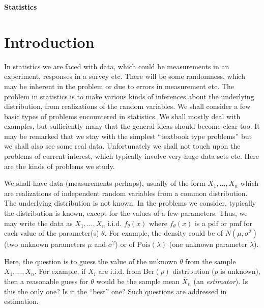 \documentclass[preprint,  11pt]{amsart}
\newcommand{\para}[1]{\vspace{4mm}\noindent{\bfseries #1:}}
\theoremstyle{plain} %
\theoremstyle{definition} %
\begin{document}
\newpage
\vspace*{\fill}
\begin{center}
\Huge {\bf Statistics}
\end{center}
\vspace*{\fill}
\newpage
\section{Introduction}
In statistics we are faced with data, which could be measurements in an experiment, responses in a survey etc. There will be some randomness, which may be inherent in the problem or due to errors in measurement etc. The problem in statistics is to make various kinds of inferences about the underlying distribution, from realizations of the random variables.  We shall consider a few basic types of problems encountered in statistics. We shall mostly deal with examples, but sufficiently many that the general ideas should become clear too. It may be remarked that we stay with the simplest ``textbook type problems'' but we shall also see some real data. Unfortunately we shall not touch upon the problems of current interest, which typically involve very huge data sets etc. Here are the kinds of problems we study.

\para{General setting} We shall have data (measurements perhaps), usually of the form $X_{1},\ldots ,X_{n}$ which are realizations of independent random variables  from a common distribution. The underlying distribution is not known. In the problems we consider, typically the distribution is known, except for the values of a few parameters. Thus, we may write the data as $X_{1},\ldots ,X_{n}$ i.i.d. $f_{\theta}(x)$ where $f_{\theta}(x)$ is a pdf or pmf for each value of the parameter(s) $\theta$. For example, the density could be of $N(\mu,{\sigma}^{2})$ (two unknown parameters $\mu$ and ${\sigma}^{2}$) or of $\mbox{Pois}(\lambda)$ (one unknown parameter $\lambda$). 

\para{(1) Estimation} Here, the question is to guess the value of the unknown $\theta$ from the sample $X_{1},\ldots ,X_{n}$. For example, if $X_{i}$ are i.i.d. from $\mbox{Ber}(p)$ distribution ($p$ is unknown), then a reasonable guess for $\theta$ would be the sample mean $\overline{X}_{n}$ (an {\em estimator}). Is this the only one? Is it the ``best'' one? Such questions are addressed in estimation.
 
\end{document}
